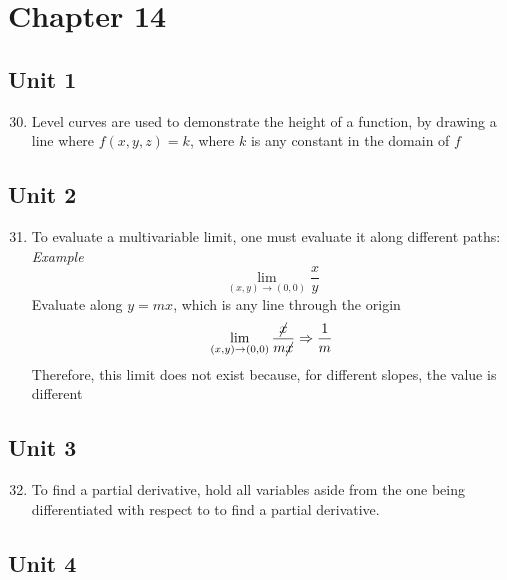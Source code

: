 \documentclass[12pt]{article}
\begin{document}
\section{Chapter 14}

\subsection{Unit 1}

\begin{enumerate}
    \setcounter{enumi}{29}

  \item Level curves are used to demonstrate the height of a function, by drawing a line where $f(x,y,z)=k$, where $k$ is any constant in the domain of $f$
\end{enumerate}
  
\subsection{Unit 2}

\begin{enumerate}
    \setcounter{enumi}{30}

  \item To evaluate a multivariable limit, one must evaluate it along different paths:
    \textit{Example}
    $$\lim_{(x,y)\to(0,0)}\frac{x}{y}$$
      Evaluate along $y=mx$, which is any line through the origin
      $$\lim_{(x,y)\to(0,0)}\frac{\cancel{x}}{m\cancel{x}}\Rightarrow\frac{1}{m}$$
      Therefore, this limit does not exist because, for different slopes, the value is different

\end{enumerate}

\subsection{Unit 3}

\begin{enumerate}
    \setcounter{enumi}{31}

  \item To find a partial derivative, hold all variables aside from the one being differentiated with respect to to find a partial derivative.

\end{enumerate}

\subsection{Unit 4}
\end{document}
